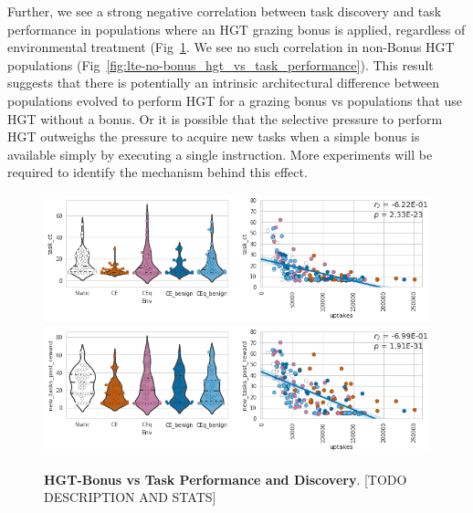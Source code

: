 \documentclass[PhD]{msu-thesis}
\begin{document}
Further, we see a strong negative correlation between task discovery and task performance in populations where an HGT grazing bonus is applied, regardless of environmental treatment (Fig~\ref{fig:lte-bonus_hgt_vs_task_performance}. We see no such correlation in non-Bonus HGT populations (Fig~\ref{fig:lte-no-bonus_hgt_vs_task_performance}). This result suggests that there is potentially an intrinsic architectural difference between populations evolved to perform HGT for a grazing bonus vs populations that use HGT without a bonus. Or it is possible that the selective pressure to perform HGT outweighs the pressure to acquire new tasks when a simple bonus is available simply by executing a single instruction. More experiments will be required to identify the mechanism behind this effect.

	\begin{figure}[!h]
	\includegraphics[trim={0 0 0 0}, clip, width=0.75\columnwidth]{figures/LTE/lte-bonus_hgt_vs_task_performance.png}
	\includegraphics[trim={0 0 0 0}, clip, width=0.75\columnwidth]{figures/LTE/lte-bonus_hgt_vs_task_discovery.png}
	\caption{\textbf{HGT-Bonus vs Task Performance and Discovery}. [TODO DESCRIPTION AND STATS]%
	}
	\label{fig:lte-bonus_hgt_vs_task_performance}
	\end{figure}
\end{document}
